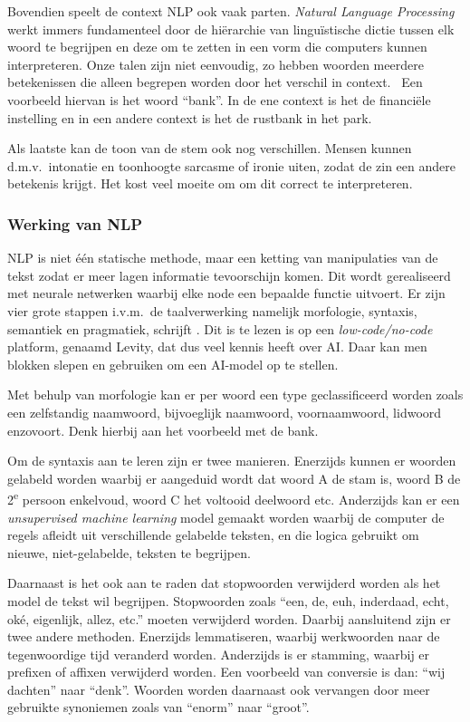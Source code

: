 Bovendien speelt de context NLP ook vaak parten. \textit{Natural Language Processing} werkt immers fundamenteel door de hiërarchie van linguïstische dictie tussen elk woord te begrijpen en deze om te zetten in een vorm die computers kunnen interpreteren. Onze talen zijn niet eenvoudig, zo hebben woorden meerdere betekenissen die alleen begrepen worden door het verschil in context.~\autocite{Kleinings2022} Een voorbeeld hiervan is het woord ``bank''. In de ene context is het de financiële instelling en in een andere context is het de rustbank in het park.

Als laatste kan de toon van de stem ook nog verschillen. Mensen kunnen d.m.v.\ intonatie en toonhoogte sarcasme of ironie uiten, zodat de zin een andere betekenis krijgt. Het kost veel moeite om om dit correct te interpreteren.

\subsubsection{Werking van NLP}
NLP is niet één statische methode, maar een ketting van manipulaties van de tekst zodat er meer lagen informatie tevoorschijn komen. Dit wordt gerealiseerd met neurale netwerken waarbij elke node een bepaalde functie uitvoert.
Er zijn vier grote stappen i.v.m.\ de taalverwerking namelijk morfologie, syntaxis, semantiek en pragmatiek, schrijft \textcite{Kleinings2022}. Dit is te lezen is op een \textit{low-code/no-code} platform, genaamd Levity, dat dus veel kennis heeft over AI. Daar kan men blokken slepen en gebruiken om een AI-model op te stellen.

Met behulp van morfologie kan er per woord een type geclassificeerd worden zoals een zelfstandig naamwoord, bijvoeglijk naamwoord, voornaamwoord, lidwoord enzovoort. Denk hierbij aan het voorbeeld met de bank.

Om de syntaxis aan te leren zijn er twee manieren. Enerzijds kunnen er woorden gelabeld worden waarbij er aangeduid wordt dat woord A de stam is, woord B de 2\textsuperscript{e} persoon enkelvoud, woord C het voltooid deelwoord etc. Anderzijds kan er een \textit{unsupervised machine learning} model gemaakt worden waarbij de computer de regels afleidt uit verschillende gelabelde teksten, en die logica gebruikt om nieuwe, niet-gelabelde, teksten te begrijpen.

Daarnaast is het ook aan te raden dat stopwoorden verwijderd worden als het model de tekst wil begrijpen. Stopwoorden zoals ``een, de, euh, inderdaad, echt, oké, eigenlijk, allez, etc.'' moeten verwijderd worden. Daarbij aansluitend zijn er twee andere methoden. Enerzijds lemmatiseren, waarbij  werkwoorden naar de tegenwoordige tijd veranderd worden.
Anderzijds is er stamming, waarbij er prefixen of affixen verwijderd worden. Een voorbeeld van conversie is dan: ``wij dachten'' naar ``denk''. Woorden worden daarnaast ook vervangen door meer gebruikte synoniemen zoals van ``enorm'' naar ``groot''.

